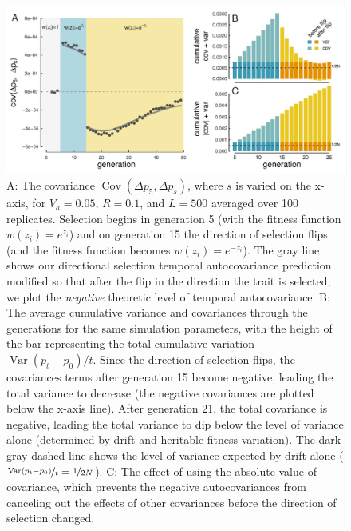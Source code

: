 \documentclass[11pt]{article}
\DeclareMathOperator{\var}{Var}
\DeclareMathOperator{\cov}{Cov}
\begin{document}
\begin{figure}
  \centering
  \includegraphics{./images/fluct-sel.pdf} 
  \caption{A: The covariance $\cov(\Delta p_5, \Delta p_s)$, where $s$
    is varied on the x-axis, for $V_a=0.05$, $R=0.1$, and $L=500$ averaged over
    100 replicates. Selection begins in generation 5 (with the fitness function
    $w(z_i)=e^{z_i}$) and on generation 15 the direction of selection flips (and
    the fitness function becomes $w(z_i) = e^{-z_i}$). The gray line shows our
    directional selection temporal autocovariance prediction modified so that
    after the flip in the direction the trait is selected, we plot the
    \emph{negative} theoretic level of temporal autocovariance. B:
    The average cumulative variance and covariances through the
    generations for the same simulation parameters, with the height of the bar
    representing the total cumulative variation $\var(p_t - p_0)/t$. Since the
    direction of selection flips, the covariances terms after generation 15
    become negative, leading the total variance to decrease (the negative
    covariances are plotted below the x-axis line). After generation 21, the
    total covariance is negative, leading the total variance to dip below the
    level of variance alone (determined by drift and heritable fitness
    variation). The dark gray dashed line shows the level of variance expected by
    drift alone ($\nicefrac{\var(p_t-p_0)}{t} = \nicefrac{1}{2N}$). C:
    The effect of using the absolute value of covariance, which prevents
    the negative autocovariances from canceling out the effects of other
    covariances before the direction of selection changed.} 
\label{fig:fluct-sel}
\end{figure}
\end{document}
